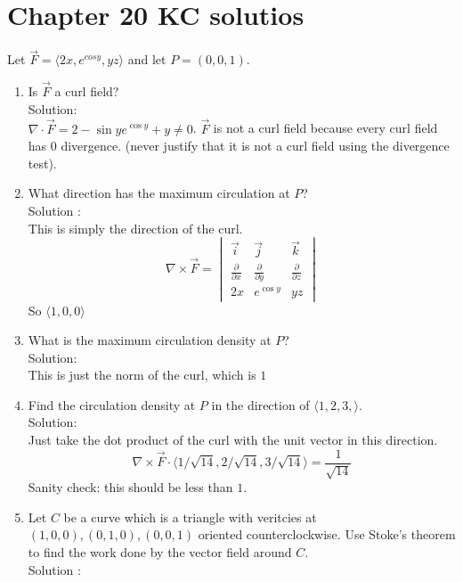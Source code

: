 \documentclass[11pt]{article}
\begin{document}
      \section{Chapter 20 KC solutios}
      Let $\vec{F} = \langle 2x, e^{cos y}, yz \rangle$ and let $P = (0,0,1)$.
      \begin{enumerate}
        \item Is $\vec{F}$ a curl field? \\
              Solution: \\
              $\nabla \cdot \vec{F}  = 2 - \sin y e^{\cos y} + y \neq 0 $. $\vec{F}$ is not a curl field because every
              curl field has $0$ divergence. (never justify that it is not a curl field using the divergence test).
        \item What direction has the maximum circulation at $P$? \\
              Solution : \\
              This is simply the direction of the curl.
              \[\nabla \times \vec{F} = \begin{vmatrix}\vec{i} & \vec{j} & \vec{k} \\ \frac{\partial}{\partial x} & \frac{\partial }{\partial y} & \frac{\partial}{\partial z} \\ 2x & e^{\cos y} & yz  \end{vmatrix}\]
              So $\langle 1, 0, 0 \rangle$
        \item What is the maximum circulation density at $P$? \\
              Solution: \\
              This is just the norm of the curl, which is $1$
        \item Find the circulation density at $P$ in the direction of $\langle 1,2,3, \rangle$. \\
              Solution: \\
              Just take the dot product of the curl with the unit vector in this direction.
              \[\nabla \times \vec{F} \cdot \langle 1/\sqrt{14}, 2/\sqrt{14}, 3/\sqrt{14} \rangle = \frac{1}{\sqrt{14}}\]
              Sanity check: this should be less than $1$.
        \item Let $C$ be a curve which is a triangle with veritcies at $(1,0,0), (0,1,0), (0,0,1)$ oriented counterclockwise.
              Use Stoke's theorem to find the work done by the vector field around $C$. \\
              Solution : \\

\end{enumerate}
\end{document}

